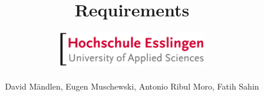 
\subject{Project MRS}
\title{Requirements}
\author{\includegraphics[width=6.5cm]{images/logo}\\ \\  David Mändlen, Eugen Muschewski, Antonio Ribul Moro, Fatih Sahin}
\date{\isodate{\today}}
\maketitle



